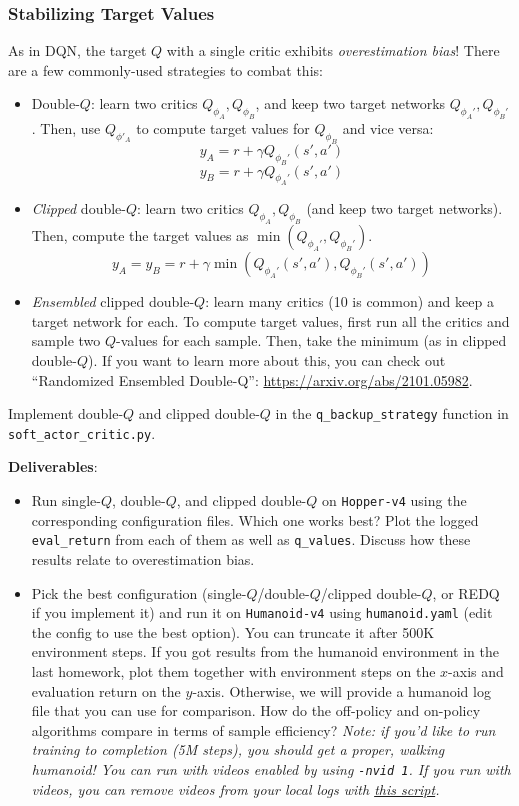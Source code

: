 \subsubsection{Stabilizing Target Values }
As in DQN, the target $Q$ with a single critic exhibits \textit{overestimation bias}! There are a few commonly-used strategies to combat this:
\begin{itemize}
    \item Double-$Q$: learn two critics $Q_{\phi_A}, Q_{\phi_B}$, and keep two target networks $Q_{\phi_A'}, Q_{\phi_B'}$. Then, use $Q_{\phi'_A}$ to compute target values for $Q_{\phi_B}$ and vice versa:
    \[y_A = r + \gamma Q_{\phi_B'}(s', a')\]
    \[y_B = r + \gamma Q_{\phi_A'}(s', a')\]
    \item \textit{Clipped} double-$Q$: learn two critics $Q_{\phi_A}, Q_{\phi_B}$ (and keep two target networks). Then, compute the target values as $\min(Q_{\phi_A'}, Q_{\phi_B'})$.
    \[y_A = y_B = r + \gamma \min\left(Q_{\phi_A'}(s', a'), Q_{\phi_B'}(s', a')\right)\]
    \item \textit{Ensembled} clipped double-$Q$: learn many critics (10 is common) and keep a target network for each. To compute target values, first run all the critics and sample two $Q$-values for each sample. Then, take the minimum (as in clipped double-$Q$). If you want to learn more about this, you can check out ``Randomized Ensembled Double-Q'': \url{https://arxiv.org/abs/2101.05982}.
\end{itemize}
Implement double-$Q$ and clipped double-$Q$ in the \verb|q_backup_strategy| function in \verb|soft_actor_critic.py|.

\textbf{Deliverables}:
\begin{itemize}
    \item Run single-$Q$, double-$Q$, and clipped double-$Q$ on \verb|Hopper-v4| using the corresponding configuration files. Which one works best? Plot the logged \verb|eval_return| from each of them as well as \verb|q_values|. Discuss how these results relate to overestimation bias.
    \item Pick the best configuration (single-$Q$/double-$Q$/clipped double-$Q$, or REDQ if you implement it) and run it on \verb|Humanoid-v4| using \verb|humanoid.yaml| (edit the config to use the best option). You can truncate it after 500K environment steps. If you got results from the humanoid environment in the last homework, plot them together with environment steps on the $x$-axis and evaluation return on the $y$-axis. Otherwise, we will provide a humanoid log file that you can use for comparison. How do the off-policy and on-policy algorithms compare in terms of sample efficiency? \textit{Note: if you'd like to run training to completion (5M steps), you should get a proper, walking humanoid! You can run with videos enabled by using \texttt{-nvid 1}. If you run with videos, you can remove videos from your local logs with \href{https://gist.github.com/kylestach/e9964f5f34ee74367547dec83eaf5fae}{this script}.}
\end{itemize}
\sacAnswerBonus
